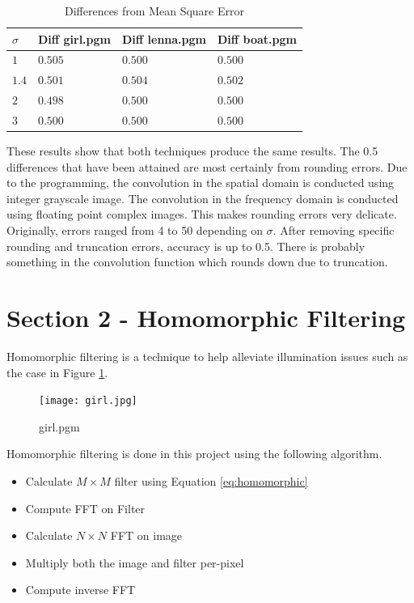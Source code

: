 \documentclass[10pt]{report}
\begin{document}
\begin{table}[!h]
\centering
\begin{tabular}{|l|l|l|l|}\hline
\textbf{$\sigma$} & \textbf{Diff girl.pgm} & \textbf{Diff lenna.pgm} & \textbf{Diff boat.pgm}\\\hline
$1$   & $0.505$ & $0.500$ & $0.500$ \\\hline
$1.4$ & $0.501$ & $0.504$ & $0.502$\\\hline
$2$   & $0.498$ & $0.500$ & $0.500$\\\hline
$3$   & $0.500$ & $0.500$ & $0.500$\\\hline
\end{tabular}
\caption{Differences from Mean Square Error}
\end{table}

These results show that both techniques produce the same results. The 0.5 differences that 
have been attained are most certainly from rounding errors. Due to the programming, the convolution
in the spatial domain is conducted using integer grayscale image. The convolution in the frequency domain
is conducted using floating point complex images. This makes rounding errors very delicate. Originally, errors
ranged from 4 to 50 depending on $\sigma$. After removing specific rounding and truncation errors, accuracy is
up to 0.5. There is probably something in the convolution function which rounds down due to truncation. 

\clearpage
\section*{Section 2 - Homomorphic Filtering}
Homomorphic filtering is a technique to help alleviate illumination issues such as the case in Figure \ref{fig:girl}.\\

\begin{figure}[!h]
\centering
\texttt{[image: girl.jpg]}
\caption{girl.pgm}
\label{fig:girl}
\end{figure}

Homomorphic filtering is done in this project using the following algorithm. \\
\begin{itemize}
\item Calculate $M \times M$ filter using Equation \ref{eq:homomorphic}
\item Compute FFT on Filter
\item Calculate $N \times N$ FFT on image
\item Multiply both the image and filter per-pixel
\item Compute inverse FFT
\end{itemize}
\end{document}
